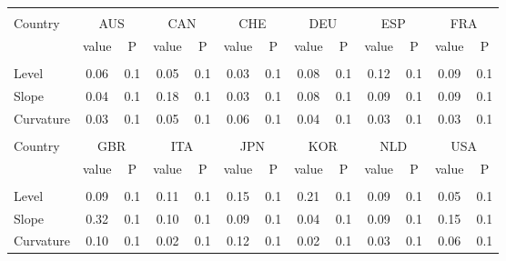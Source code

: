 \documentclass[12pt,bibliography=totoc]{article}
\begin{document}
\begin{appendices}
\begin{table}[H]
\begin{subtable}[t]{1\textwidth}
\centering
\begin{tabular}{l cc cc cc cc cc cc}%
\hline\hline \\ [-1.5ex]                         %

Country	&	\multicolumn{2}{c}{AUS}			&	\multicolumn{2}{c}{CAN}			&	\multicolumn{2}{c}{CHE}			&	\multicolumn{2}{c}{DEU}			&	\multicolumn{2}{c}{ESP}			&	\multicolumn{2}{c}{FRA}			\\[0.5ex] 

 & value &P & value &P& value &P & value &P& value &P & value &P\\

\hline       \\ [-1.5ex] 

Level	&	0.06 & 0.1 		& 0.05 & 0.1 		& 0.03 & 0.1 		& 0.08 & 0.1 		& 0.12 & 0.1 		& 0.09 & 0.1	\\
Slope	&	0.04 & 0.1 		& 0.18 & 0.1 		& 0.03 & 0.1 		& 0.08 & 0.1 		& 0.09 & 0.1 		& 0.09 & 0.1\\
Curvature&	0.03& 0.1 		& 0.05 & 0.1 		& 0.06 & 0.1 		& 0.04 & 0.1 		& 0.03 & 0.1 		& 0.03 & 0.1\\


\hline   \\ [-1.5ex]    

Country	&	\multicolumn{2}{c}{GBR}			&	\multicolumn{2}{c}{ITA}			&	\multicolumn{2}{c}{JPN}			&	\multicolumn{2}{c}{KOR}			&	\multicolumn{2}{c}{NLD}			&	\multicolumn{2}{c}{USA}			\\

 & value &P & value &P& value &P & value &P& value &P & value &P\\

\hline       \\ [-1.5ex] 

Level	&	0.09 & 0.1 		& 0.11 & 0.1 		& 0.15 & 0.1 		& 0.21 & 0.1 		& 0.09 & 0.1 		& 0.05 & 0.1	\\
Slope	&	0.32 & 0.1 		& 0.10 & 0.1 		& 0.09 & 0.1 		& 0.04 & 0.1 		& 0.09 & 0.1 		& 0.15 & 0.1 \\
Curvature	&0.10 & 0.1 		& 0.02 & 0.1 		& 0.12 & 0.1 		& 0.02 & 0.1 		& 0.03 & 0.1 		& 0.06 & 0.1	\\



\end{tabular}
\end{subtable}
\end{table}
\end{appendices}
\end{document}

